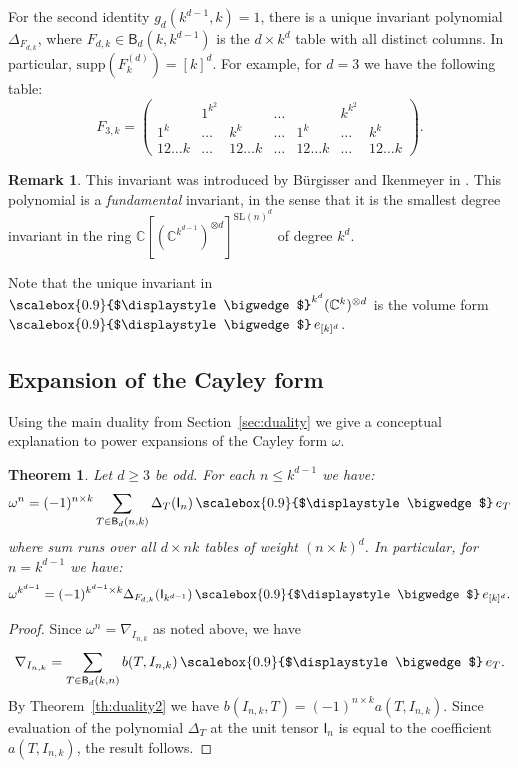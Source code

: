 \documentclass[12pt, reqno]{amsart}
\newtheorem{theorem}{Theorem}[section]
\theoremstyle{definition}
\newtheorem{remark}{Remark}[section]
\let\oldbigwedge\bigwedge
\renewcommand{\bigwedge}{
  \mathop{
    \vcenter{
      \hbox{\scalebox{0.9}{$\displaystyle\oldbigwedge$}}
    }
  }
}
\begin{document}
{For the second identity} $g_d(k^{d-1}, k)=1$, there is a unique invariant polynomial $\Delta_{F_{d,k}}$, where $F_{d,k} \in \mathsf{B}_d(k, k^{d-1})$ is the $d \times k^{d}$ table with all distinct columns. In particular, $\mathrm{supp}(F^{(d)}_k) = [k]^d$. For example, for $d = 3$ we have the following table:
$$
    F_{3,k} = \begin{pmatrix}
        ~ & 1^{k^{2}} & ~ &\ldots & ~ & k^{k^{2}} & ~
        \\
        1^{k} & \ldots & k^{k} &
        \ldots & 
        1^{k} & \ldots & k^{k}
        \\
        12\ldots k & \ldots & 12\ldots k 
        & \ldots & 
        12\ldots k & \ldots & 12\ldots k 
    \end{pmatrix}.
$$
\begin{remark}
This invariant was introduced by B\"urgisser and Ikenmeyer in \cite{bi}.
This polynomial is a \textit{fundamental} invariant, in the sense that it is the smallest degree invariant in the ring $\mathbb{C}[(\mathbb{C}^{k^{d-1}})^{\otimes d}]^{\mathrm{SL}(n)^d}$ of degree $k^d$. \end{remark}


Note that the unique invariant in $\bigwedge^{k^d} (\mathbb{C}^{k})^{\otimes d}$ is the volume form $\bigwedge e_{[k]^d}$.



\subsection{Expansion of the Cayley form}
Using the main duality from Section~\ref{sec:duality} we give a conceptual explanation to power expansions of the Cayley form $\omega$. %

\begin{theorem}\label{thm:omega}%
    Let $d \ge 3$ be odd. For each $n \le k^{d-1}$ we have:
    $$
        \omega^n = (-1)^{n \times k} \sum_{T\in \mathsf{B}_d(n,k)} \Delta_T(\mathsf{I}_n) \bigwedge e_T
    $$
    where sum runs over all $d \times nk$ tables of weight $(n \times k)^d$. In particular, for $n = k^{d-1}$ we have:
    $$
        \omega^{k^{d-1}} = (-1)^{k^{d-1} \times k} \Delta_{F_{d,k}}
        (\mathsf{I}_{k^{d-1}})
        \bigwedge e_{[k]^d}. %
    $$
\end{theorem}
\begin{proof}
    Since $\omega^n = \nabla_{I_{n,k}}$ as noted above, we have
    $$\nabla_{I_{n,k}} = \sum_{T \in \mathsf{B}_d(k,n)} b(T, I_{n,k}) \bigwedge e_T.$$
    By Theorem~\ref{th:duality2} we have $b(I_{n,k}, T) = (-1)^{n \times k} a(T, I_{n,k})$. 
    Since evaluation of the polynomial $\Delta_T$ at the unit tensor $\mathsf{I}_n$ is equal to the coefficient $a(T, I_{n,k})$, the result follows.
\end{proof}
\end{document}
